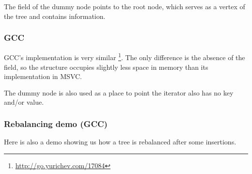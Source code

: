 The  field of the dummy node points to the root node, which serves
as a vertex of the tree and contains information.

\subsubsection{GCC}





GCC's implementation is very similar
\footnote{\url{http://go.yurichev.com/17084}}.
The only difference is the absence of the  field,
so the structure occupies slightly less space in memory than its implementation in MSVC.

The dummy node is also used as a place to point the  iterator also has no key and/or value.

\subsubsection{Rebalancing demo (GCC)}

Here is also a demo showing us how a tree is rebalanced after some insertions.





